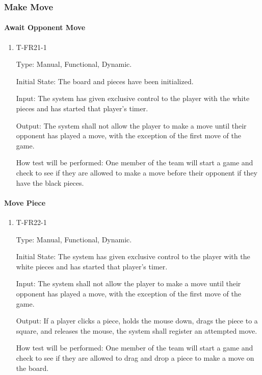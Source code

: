 \documentclass[12pt, titlepage]{article}
\begin{document}
\subsubsection{Make Move}

    \paragraph{Await Opponent Move}

        \begin{enumerate}

        \item{T-FR21-1\\}

            Type: Manual, Functional, Dynamic.
            					
            Initial State: The board and pieces have been initialized.
            					
            Input: The system has given exclusive control to the player with the white pieces and has started that player’s timer.
            					
            Output: The system shall not allow the player to make a move until their opponent has played a move,
            with the exception of the first move of the game.

            How test will be performed: One member of the team will start a game and check to see if they are allowed to make a move before their opponent if they have the black pieces.

        \end{enumerate}

    \paragraph{Move Piece}

        \begin{enumerate}

        \item{T-FR22-1\\}

            Type: Manual, Functional, Dynamic.
            					
            Initial State: The system has given exclusive control to the player with the white pieces and has started that player’s timer.
            					
            Input: The system shall not allow the player to make a move until their opponent has played a move,
            with the exception of the first move of the game.
            					
            Output: If a player clicks a piece, holds the mouse down, drags the piece to a square, and releases the mouse, the system shall register an attempted move.

            How test will be performed: One member of the team will start a game and check to see if they are allowed to drag and drop a piece to make a move on the board.

        \end{enumerate}
\end{document}
